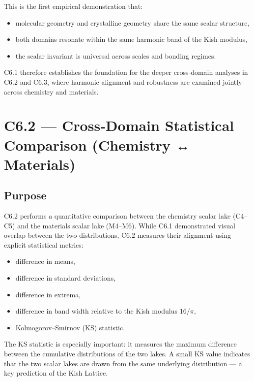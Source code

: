 \documentclass[11pt, letterpaper, openany]{book}
\begin{document}
This is the first empirical demonstration that:

\begin{itemize}
    \item molecular geometry and crystalline geometry share the same scalar
          structure,
    \item both domains resonate within the same harmonic band of the Kish
          modulus,
    \item the scalar invariant is universal across scales and bonding regimes.
\end{itemize}

C6.1 therefore establishes the foundation for the deeper cross‑domain analyses in
C6.2 and C6.3, where harmonic alignment and robustness are examined jointly across
chemistry and materials.


\section{C6.2 — Cross‑Domain Statistical Comparison (Chemistry ↔ Materials)}

\subsection*{Purpose}
C6.2 performs a quantitative comparison between the chemistry scalar lake
(C4–C5) and the materials scalar lake (M4–M6). While C6.1 demonstrated visual
overlap between the two distributions, C6.2 measures their alignment using
explicit statistical metrics:

\begin{itemize}
    \item difference in means,
    \item difference in standard deviations,
    \item difference in extrema,
    \item difference in band width relative to the Kish modulus \(16/\pi\),
    \item Kolmogorov–Smirnov (KS) statistic.
\end{itemize}

The KS statistic is especially important: it measures the maximum difference
between the cumulative distributions of the two lakes. A small KS value
indicates that the two scalar lakes are drawn from the same underlying
distribution — a key prediction of the Kish Lattice.
\end{document}
